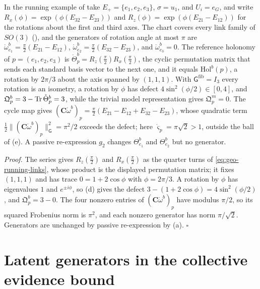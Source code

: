 In the running example of  take $E_+=\{e_1,e_2,e_3\}$, $\sigma=u_1$, and
$U_i=e_G$, and write $R_x(\phi)=\exp(\phi(E_{32}-E_{23}))$ and $R_z(\phi)=\exp(\phi(E_{21}-E_{12}))$ for
the rotations about the first and third axes. The chart covers every link family of $SO(3)$
(), and the generators of rotation angle at most $\pi$ are
$\mathring\omega^b_{e_1}=\tfrac\pi2(E_{21}-E_{12})$, $\mathring\omega^b_{e_2}=\tfrac\pi2(E_{32}-E_{23})$,
and $\mathring\omega^b_{e_3}=0$. The reference holonomy of $p=(e_1,e_2,e_3)$ is
$\mathring\Theta^b_p=R_z(\tfrac\pi2)R_x(\tfrac\pi2)$, the cyclic permutation matrix that sends each
standard basis vector to the next one, and it equals $\mathrm{Hol}^b(p)$, a rotation by $2\pi/3$ about the
axis spanned by $(1,1,1)$. With $\mathsf G^{\mathrm{fib}}=I_3$ every rotation is an isometry, a rotation
by $\phi$ has defect $4\sin^2(\phi/2)\in[0,4]$, and $\mathfrak Q^b_p=3-\operatorname{Tr}\mathring\Theta^b_p=3$, while the
trivial model representation gives $\mathfrak Q^m_p=0$. The cycle map gives
$(\mathbf C\mathring\omega^b)_p=\tfrac\pi2(E_{21}-E_{12}+E_{32}-E_{23})$, whose quadratic term
$\tfrac12\lVert(\mathbf C\mathring\omega^b)_p\rVert^2_{\mathsf G}=\pi^2/2$ exceeds the defect; here
$\mathring\varsigma_p=\pi\sqrt2>1$, outside the ball of (e). A passive
re-expression $g_2$ changes $\Theta^b_{e_1}$ and $\Theta^b_{e_2}$ but no generator.

\noindent\emph{Proof.}
The series gives $R_z(\tfrac\pi2)$ and $R_x(\tfrac\pi2)$ as the quarter turns of \cref{eq:geo-running-links},
whose product is the displayed permutation matrix; it fixes $(1,1,1)$ and has trace $0=1+2\cos\phi$ with
$\phi=2\pi/3$. A rotation by $\phi$ has eigenvalues $1$ and $e^{\pm i\phi}$, so
(d) gives the defect $3-(1+2\cos\phi)=4\sin^2(\phi/2)$, and
$\mathfrak Q^b_p=3-0$. The four nonzero entries of $(\mathbf C\mathring\omega^b)_p$ have modulus $\pi/2$,
so its squared Frobenius norm is $\pi^2$, and each nonzero generator has norm $\pi/\sqrt2$. Generators
are unchanged by passive re-expression by (a). \hfill$\square$

\section{Latent generators in the collective evidence bound}
\label{sec:link-latent}

